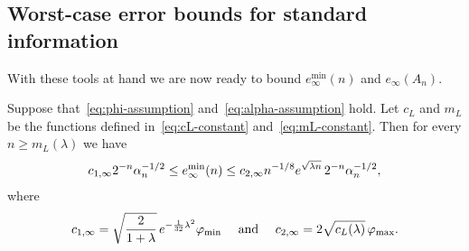 \documentclass{mcom-l}
\numberwithin{equation}{section}
\numberwithin{theorem}{section} %
\begin{document}
\subsection{Worst-case error bounds for standard information}

With these tools at hand we are now ready to bound $e_\infty^{\min}(n)$ and $e_\infty(A_n)$.

\begin{theorem} \label{thm:e-min-unif}
  Suppose that~\eqref{eq:phi-assumption} and~\eqref{eq:alpha-assumption} hold.
  Let $c_L$ and $m_L$ be the functions defined in~\eqref{eq:cL-constant} and~\eqref{eq:mL-constant}.
  Then for every $n \geq m_L(\lambda)$ we have
  \begin{equation*}
    c_{1,\infty} 2^{-n} \alpha_n^{-1/2} \leq e_\infty^{\min}(n) \leq  c_{2,\infty} n^{-1/8} e^{\sqrt{\smash[b]{\lambda n}}} \, 2^{-n} \alpha_n^{-1/2},
  \end{equation*}
  where
  \begin{equation} \label{eq:unif-constants}
    c_{1,\infty} = \sqrt{ \frac{2}{1 + \lambda}} \, e^{-\frac{1}{32} \lambda^2} \varphi_\textup{min} \quad \text{ and } \quad c_{2,\infty} = 2 \sqrt{c_L(\lambda)} \, \varphi_{\max}.
  \end{equation}
\end{theorem}
\end{document}
